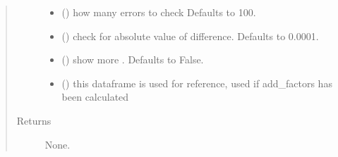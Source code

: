 \documentclass[letterpaper,10pt,english]{sphinxmanual}
\begin{document}
\begin{fulllineitems}
\begin{fulllineitems}
\begin{quote}
\begin{description}
\begin{itemize}
\item {} 
\sphinxAtStartPar
{} (\sphinxstyleliteralemphasis{\sphinxupquote{, }}) \textendash{} how many errors to check Defaults to 100.

\item {} 
\sphinxAtStartPar
{} (\sphinxstyleliteralemphasis{\sphinxupquote{, }}) \textendash{} check for absolute value of difference. Defaults to 0.0001.

\item {} 
\sphinxAtStartPar
{} (\sphinxstyleliteralemphasis{\sphinxupquote{, }}) \textendash{} show more . Defaults to False.

\item {} 
\sphinxAtStartPar
{} (\sphinxstyleliteralemphasis{\sphinxupquote{, }}) \textendash{} this dataframe is used for reference, used if add\_factors has been calculated

\end{itemize}

\item[{Returns}] \leavevmode
\sphinxAtStartPar
None.

\end{description}\end{quote}

\end{fulllineitems}


\begin{fulllineitems}
\label{\detokenize{core/modelclass:modelclass.Model_help_Mixin.print_model}}
\pysigstartsignatures
{}
\pysigstopsignatures
\end{fulllineitems}


\begin{fulllineitems}
\label{\detokenize{core/modelclass:modelclass.Model_help_Mixin.print_model_latex}}
\pysigstartsignatures
{}
\pysigstopsignatures
\end{fulllineitems}


\end{fulllineitems}
\end{document}
